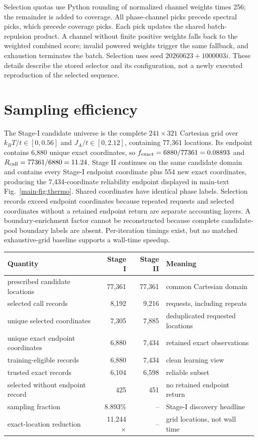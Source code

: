 Selection quotas use Python rounding of normalized channel weights times 256; the remainder is added to coverage. All phase-channel picks precede spectral picks, which precede coverage picks. Each pick updates the shared batch-repulsion product. A channel without finite positive weights falls back to the weighted combined score; invalid powered weights trigger the same fallback, and exhaustion terminates the batch. Selection uses seed $20260623+1000003i$. These details describe the stored selector and its configuration, not a newly executed reproduction of the selected sequence.

\section{Sampling efficiency}\label{sec:counts}
The Stage-I candidate universe is the complete $241\times321$ Cartesian grid over $k_BT/t\in[0,0.56]$ and $J_A/t\in[0,2.12]$, containing 77,361 locations.  Its endpoint contains 6,880 unique exact coordinates, so $f_{\rm exact}=6880/77361=0.08893$ and $R_{\rm call}=77361/6880=11.24$.  Stage II continues on the same candidate domain and contains every Stage-I endpoint coordinate plus 554 new exact coordinates, producing the 7,434-coordinate reliability endpoint displayed in main-text Fig.~\ref{main-fig:thermo}.  Shared coordinates have identical phase labels.  Selection records exceed endpoint coordinates because repeated requests and selected coordinates without a retained endpoint return are separate accounting layers.  A boundary-enrichment factor cannot be reconstructed because complete candidate-pool boundary labels are absent.  Per-iteration timings exist, but no matched exhaustive-grid baseline supports a wall-time speedup.
\begin{AnchoredTable}\caption{Stage-resolved selection and retained-coordinate accounting.}\label{tab:counts}\centering\setlength{\tabcolsep}{5pt}\begin{tabular}{lrrl}\toprule Quantity&Stage I&Stage II&Meaning\\\midrule prescribed candidate locations&77,361&77,361&common Cartesian domain\\ selected call records&8,192&9,216&requests, including repeats\\ unique selected coordinates&7,305&7,885&deduplicated requested locations\\ unique exact endpoint coordinates&6,880&7,434&retained exact observations\\ training-eligible records&6,880&7,434&clean learning view\\ trusted exact records&6,104&6,598&reliable subset\\ selected without endpoint record&425&451&no retained endpoint return\\\midrule sampling fraction&8.893\%&--&Stage-I discovery headline\\ exact-location reduction&11.244$\times$&--&grid locations, not wall time\\\bottomrule\end{tabular}\end{AnchoredTable}
